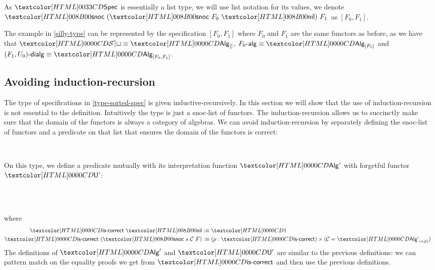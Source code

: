 As $\specty$ is essentially a list type, we will use list notation for
its values, \eg we denote $\specsnoc\ (\specsnoc\ F_0\ \specnil)\ F_1$
as $[F_0,F_1]$.

\begin{example}
  The example in \cref{silly-type} can be represented by the
  specification $[F_0, F_1]$ where $F_0$ and $F_1$ are the same
  functors as before, as we have that $\SET \defeq \Alg_{[]}$,
  $\algcat{F_0} \defeq \Alg_{[F_0]}$ and
  $\dialgcat{F_1}{U_0} \defeq \Alg_{[F_0,F_1]}$.
\end{example}

\subsection{Avoiding induction-recursion}
\label{avoiding-induction-recursion}

The type of specifications in \cref{type-sorted-spec} is given
inductive-recursively. In this section we will show that the use of
induction-recursion is not essential to the definition. Intuitively
the type is just a snoc-list of functors. The induction-recursion
allows us to succinctly make sure that the domain of the functors is
always a category of algebras. We can avoid induction-recursion by
separately defining the snoc-list of functors and a predicate on that
list that ensures the domain of the functors is correct:

\begin{definition}
  \begin{datatype}{\specaltty}{\Set}
    \constr{\specaltnil}{\specaltty} \\
    \constr{\specaltsnoc}{\specaltty \to (\Cc : \Cat)\ (\Func{\Cc}{\SET}) \to \specaltty}
  \end{datatype}
  On this type, we define a predicate mutually with its interpretation
  function $\Algalt$ with forgetful functor $\Undalt$:
  \begin{sorts}
    \functy{\specaltiscorrect}{\specaltty \to \Set} \\
     \\
  \end{sorts}
  where
  \begin{align*}
    \specaltiscorrect\ \specaltnil &\ddefeq \unitty \\
    \specaltiscorrect\ (\specaltsnoc\ s\ \Cc\ F) &\ddefeq (p : \specaltiscorrect) \times (\Cc = \Algalt_{(s,p)})
  \end{align*}
  The definitions of $\Alg'$ and $\Und'$ are similar to the previous
  definitions: we can pattern match on the equality proofs we get from
  $\specaltiscorrect$ and then use the previous definitions.
\end{definition}

